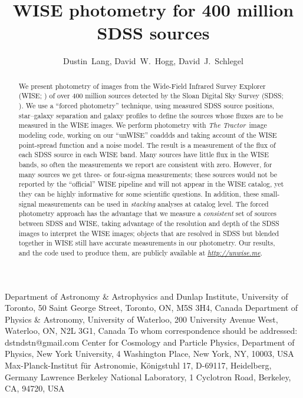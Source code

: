 \documentclass[12pt,preprint]{aastex}
\newcommand{\niceurl}[1]{\href{#1}{\textsl{#1}}}
\newcommand{\Thetractor}{\textsl{The Tractor}}
\begin{document}
\title{WISE photometry for 400 million SDSS sources}
\author{%
  Dustin~Lang,
  David~W.~Hogg,
  David~J.~Schlegel}
%
%
{Department of Astronomy \& Astrophysics and Dunlap Institute,
  University of Toronto,
  50 Saint George Street, Toronto, ON, M5S 3H4, Canada}
%
{Department of Physics \& Astronomy,
  University of Waterloo,
  200 University Avenue West,
  Waterloo, ON, N2L 3G1, Canada}
%
{To whom correspondence should be addressed: dstndstn@gmail.com}
%
{Center for Cosmology and Particle Physics,
  Department of Physics, New York University,
  4 Washington Place, New York, NY, 10003, USA}
%
{Max-Planck-Institut f\"ur Astronomie,
  K\"onigstuhl 17, D-69117, Heidelberg, Germany}
%
{Lawrence Berkeley National Laboratory,
  1 Cyclotron Road, Berkeley, CA, 94720, USA}
\date{}

\begin{abstract}
We present photometry of images from the Wide-Field Infrared Survey
Explorer (WISE; \citealt{wright}) of over 400 million sources detected
by the Sloan Digital Sky Survey (SDSS; \citealt{york}).
%
%
We use a ``forced photometry'' technique, using measured SDSS source
positions, star--galaxy separation and galaxy profiles to define the
sources whose fluxes are to be measured in the WISE images.
%
We perform photometry with \Thetractor\ image modeling code, working
on our ``unWISE'' coaddds and taking account of the WISE point-spread
function and a noise model.
%
The result is a measurement of the flux of each SDSS source in each
WISE band.  Many sources have little flux in the WISE bands, so often
the measurements we report are consistent with zero.  However, for
many sources we get three- or four-sigma measurements; these sources
would not be reported by the ``official'' WISE pipeline and will not
appear in the
WISE catalog, yet they can be highly informative for some scientific
questions.  In addition, these small-signal measurements can be used
in \emph{stacking} analyses at catalog level.  The forced photometry
approach has the advantage that we measure a \emph{consistent} set of
sources between SDSS and WISE, taking advantage of the resolution and
depth of the SDSS images to interpret the WISE images; objects that
are resolved in SDSS but blended together in WISE still have accurate
measurements in our photometry.
%
Our results, and the code used to produce them, are publicly available
at \niceurl{http://unwise.me}.
\end{abstract}
\end{document}
